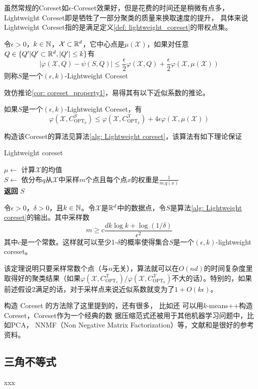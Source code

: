 虽然常规的Coreset如$\epsilon$-Coreset效果好，但是花费的时间还是稍微有点多，Lightweight Coreset即是牺牲了一部分聚类的质量来换取速度的提升， 具体来说Lightweight Coreset指的是满足定义\ref{def: lightweight_coreset}的带权点集。
\begin{definition}
    \label{def: lightweight_coreset}
    令$\epsilon > 0$，$k \in \mathbb{N}$，$\mathcal{X} \subset \mathbb{R}^d$，它中心点是$\mu(\mathcal{X})$，如果对任意$Q \in \{Q'| Q' \subset \mathbb{R}^d, |Q'| \leq k\}$有
    \begin{equation*}
        |\varphi(\mathcal{X},Q) - \psi(S,Q)| \leq \frac{\epsilon}{2}\varphi(\mathcal{X},Q) + \frac{\epsilon}{2}\varphi(\mathcal{X},\mu(\mathcal{X}))
    \end{equation*}
    则称$S$是一个$(\epsilon,k)$-Lightweight Coreset
\end{definition}
效仿推论\ref{cor: coreset_property1}，易得其有以下近似系数的推论。
\begin{corollary}
    如果$S$是一个$(\epsilon,k)$-Lightweight Coreset，有
    \begin{equation*}
        \varphi(\mathcal{X},C_{\text{OPT}_k}^S) \leq \varphi(\mathcal{X},C_{\text{OPT}_k}^{\mathcal{X}}) + 4\epsilon\varphi(\mathcal{X},\mu(\mathcal{X}))
    \end{equation*}
\end{corollary}
构造该Coreset的算法见算法\ref{alg: Lightweight coreset}，该算法有如下理论保证
\begin{algorithm}
    \caption{Lightweight coreset}\label{alg: Lightweight coreset}
    $\mu \gets$ 计算$\mathcal{X}$的均值 \\
    $S \gets $ 依分布$q$从$\mathcal{X}$中采样$m$个点且每个点$x$的权重是$\frac{1}{m.q(x)}$ \\
    \textbf{返回} $S$
\end{algorithm}
\begin{theorem}
    \label{theo: lightweight_coreset}
    令$\epsilon>0$，$\delta>0$，且$k\in \mathbb{N}$。令$\mathcal{X}$是$\mathbb{R}^d$中的数据点，令$S$是算法\ref{alg: Lightweight coreset}的输出。其中采样数
    \begin{equation*}
        m \geq c\frac{dk\log k + \log(1/\delta)}{\epsilon^2}
    \end{equation*}
    其中$c$是一个常数。这样就可以至少1-$\delta$的概率使得集合$S$是一个$(\epsilon,k)$-lightweight coreset。
\end{theorem}
该定理说明只要采样常数个点（与$n$无关），算法就可以在$O(nd)$的时间复杂度里取得好的聚类结果（如果$\varphi(\mathcal{X},C_{\text{OPT}_1}^{\mathcal{X}})/\varphi(\mathcal{X},C_{\text{OPT}_k}^{\mathcal{X}})$不大的话）。特别的，如果前述假设2满足的话，对于采样点来说近似系数就变为了$1+O(k\epsilon)$。

构造 Coreset 的方法除了这里提到的，还有很多， 比如还
可以用$k$-means++构造Coreset，Coreset作为一个经典的数
据压缩范式还被用于其他机器学习问题中，比如PCA， NNMF（Non Negative Matrix Factorization）等，文献\cite{bachem2017practical}和\cite{feldman2013turning}是很好的参考资料。

\subsection{三角不等式}
xxx
